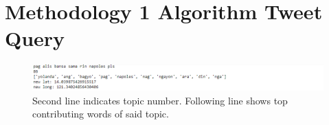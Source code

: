 \chapter{Methodology 1 Algorithm Tweet Query}

\begin{figure}[hbt!]
    \includegraphics[width=\textwidth, height=\textheight,keepaspectratio]{Method1Query.PNG}
    \caption{Second line indicates topic number. Following line shows top contributing words of said topic.}
\end{figure}